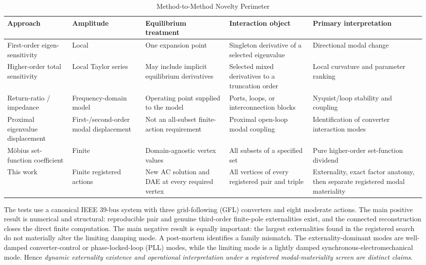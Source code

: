 \begin{table}[t]
\caption{Method-to-Method Novelty Perimeter}
\label{tab:methods}
\centering
\scriptsize
\begin{tabular}{p{}p{}p{}p{}p{}}
\toprule
Approach & Amplitude & Equilibrium treatment & Interaction object & Primary interpretation\\
\midrule
First-order eigen-sensitivity
& Local
& One expansion point
& Singleton derivative of a selected eigenvalue
& Directional modal change\\
Higher-order total sensitivity
& Local Taylor series
& May include implicit equilibrium derivatives
& Selected mixed derivatives to a truncation order
& Local curvature and parameter ranking\\
Return-ratio / impedance
& Frequency-domain model
& Operating point supplied to the model
& Ports, loops, or interconnection blocks
& Nyquist/loop stability and coupling\\
Proximal eigenvalue displacement \cite{dewangan2026interaction}
& First-/second-order modal displacement
& Not an all-subset finite-action requirement
& Proximal open-loop modal coupling
& Identification of converter interaction modes\\
M\"obius set-function coefficient
& Finite
& Domain-agnostic vertex values
& All subsets of a specified set
& Pure higher-order set-function dividend\\
This work
& Finite registered actions
& New AC solution and DAE at every required vertex
& All vertices of every registered pair and triple
& Externality, exact factor anatomy, then separate registered modal materiality\\
\bottomrule
\end{tabular}
\end{table}

The tests use a canonical IEEE 39-bus system with three grid-following (GFL)
converters and eight moderate actions. The main positive result is numerical
and structural: reproducible pair and genuine third-order finite-pole
externalities exist, and the connected reconstruction closes the direct
finite computation. The main negative result is equally important: the
largest externalities found in the registered search do not materially alter
the limiting damping mode. A post-mortem identifies a family mismatch. The
externality-dominant modes are well-damped converter-control or
phase-locked-loop (PLL) modes, while the limiting mode is a lightly damped
synchronous-electromechanical mode. Hence \emph{dynamic externality existence
and operational interpretation under a registered modal-materiality screen
are distinct claims}.

